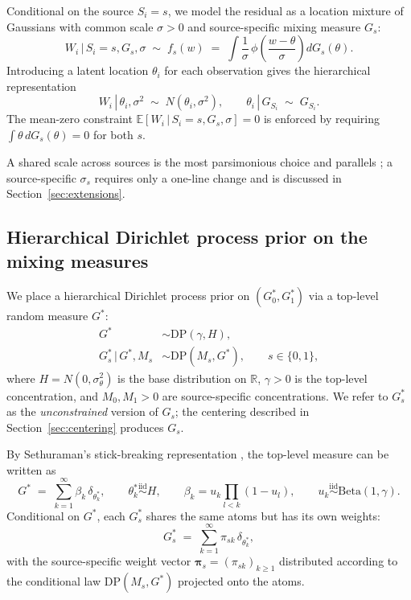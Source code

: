 \documentclass[11pt]{article}
\theoremstyle{plain}
\theoremstyle{definition}
\theoremstyle{remark}
\newcommand{\E}{\mathbb{E}}
\newcommand{\1}{\mathds{1}}
\newcommand{\given}{\,|\,}
\newcommand{\R}{\mathbb{R}}
\begin{document}
Conditional on the source $S_i = s$, we model the residual as a location mixture of Gaussians with common scale $\sigma > 0$ and source-specific mixing measure $G_s$:
\begin{equation}
W_i \given S_i = s, G_s, \sigma \;\sim\; f_s(w) \;=\; \int \frac{1}{\sigma}\, \phi\!\left(\frac{w - \theta}{\sigma}\right) dG_s(\theta).
\label{eq:fs}
\end{equation}
Introducing a latent location $\theta_i$ for each observation gives the hierarchical representation
\begin{equation}
W_i \given \theta_i, \sigma^2 \;\sim\; N(\theta_i, \sigma^2), \qquad \theta_i \given G_{S_i} \;\sim\; G_{S_i}.
\label{eq:hierarchical-w}
\end{equation}
The mean-zero constraint $\E[W_i \given S_i = s, G_s, \sigma] = 0$ is enforced by requiring $\int \theta\, dG_s(\theta) = 0$ for both $s$.

A shared scale across sources is the most parsimonious choice and parallels \citet{henderson2020individualized}; a source-specific $\sigma_s$ requires only a one-line change and is discussed in Section~\ref{sec:extensions}.

\subsection{Hierarchical Dirichlet process prior on the mixing measures}

We place a hierarchical Dirichlet process prior \citep{teh2006hierarchical} on $(G_0^*, G_1^*)$ via a top-level random measure $G^*$:
\begin{align}
G^* &\sim \mathrm{DP}(\gamma, H), \\
G_s^* \given G^*, M_s &\sim \mathrm{DP}(M_s, G^*), \qquad s \in \{0, 1\},
\end{align}
where $H = N(0, \sigma_\theta^2)$ is the base distribution on $\R$, $\gamma > 0$ is the top-level concentration, and $M_0, M_1 > 0$ are source-specific concentrations. We refer to $G_s^*$ as the \emph{unconstrained} version of $G_s$; the centering described in Section~\ref{sec:centering} produces $G_s$.

By Sethuraman's stick-breaking representation \citep{sethuraman1994constructive}, the top-level measure can be written as
\begin{equation}
G^* \;=\; \sum_{k=1}^\infty \beta_k\, \delta_{\theta_k^*}, \qquad
\theta_k^* \stackrel{\mathrm{iid}}{\sim} H, \qquad
\beta_k = u_k \prod_{l < k}(1 - u_l), \qquad
u_k \stackrel{\mathrm{iid}}{\sim} \mathrm{Beta}(1, \gamma).
\end{equation}
Conditional on $G^*$, each $G_s^*$ shares the same atoms but has its own weights:
\begin{equation}
G_s^* \;=\; \sum_{k=1}^\infty \pi_{sk}\, \delta_{\theta_k^*},
\end{equation}
with the source-specific weight vector $\bm{\pi}_s = (\pi_{sk})_{k \ge 1}$ distributed according to the conditional law $\mathrm{DP}(M_s, G^*)$ projected onto the atoms.
\end{document}
